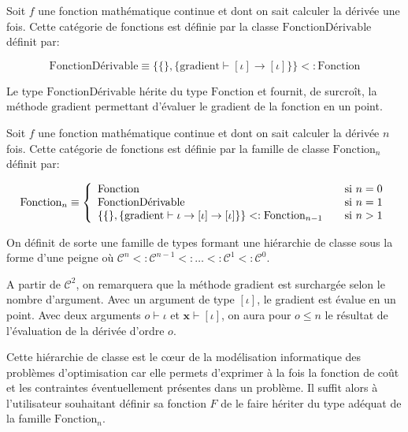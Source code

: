 \begin{mydef}\label{def:chap1_derivfcn}
  Soit $f$ une fonction mathématique continue et dont on sait calculer
  la dérivée une fois. Cette catégorie de fonctions est définie par la
  classe $\text{FonctionDérivable}$ définit par:

  \begin{equation}
    \text{FonctionDérivable} \equiv \{ \{ \}, \{ \text{gradient}
    \vdash [\iota] \rightarrow [\iota] \} \} <: \text{Fonction}
  \end{equation}

  Le type $\text{FonctionDérivable}$ hérite du type $\text{Fonction}$
  et fournit, de surcroît, la méthode $\text{gradient}$ permettant
  d'évaluer le gradient de la fonction en un point.
\end{mydef}

\begin{mydef}\label{def:chap1_nderivfcn}
  Soit $f$ une fonction mathématique continue et dont on sait calculer
  la dérivée $n$ fois. Cette catégorie de fonctions est définie par la
  famille de classe $\text{Fonction}_n$ définit par:

  \begin{equation}
    \text{Fonction}_n \equiv
    \left\{
    \begin{array}{l l}
      \text{Fonction} & \quad \text{si $n = 0$}\\
      \text{FonctionDérivable} & \quad \text{si $n = 1$}\\
      \{ \{ \}, \{ \text{gradient} \vdash \iota \rightarrow [\iota] \rightarrow [\iota] \} \} <: \text{Fonction}_{n-1} & \quad \text{si $n > 1$}\\
    \end{array} \right.
  \end{equation}

  On définit de sorte une famille de types formant une hiérarchie de
  classe sous la forme d'une peigne où $\mathcal{C}^n <:
  \mathcal{C}^{n-1} <: \dotsc <: \mathcal{C}^1 <: \mathcal{C}^0$.

  A partir de $\mathcal{C}^2$, on remarquera que la méthode
  $\text{gradient}$ est surchargée selon le nombre d'argument. Avec un
  argument de type $[\iota]$, le gradient est évalue en un point. Avec
  deux arguments $o \vdash \iota$ et $\mathbf{x} \vdash [\iota]$, on
  aura pour $o \leq n$ le résultat de l'évaluation de la dérivée d'ordre
  $o$.
\end{mydef}


Cette hiérarchie de classe est le c\oe ur de la modélisation
informatique des problèmes d'optimisation car elle permets d'exprimer
à la fois la fonction de coût et les contraintes éventuellement
présentes dans un problème. Il suffit alors à l'utilisateur souhaitant
définir sa fonction $F$ de le faire hériter du type adéquat de la
famille $\text{Fonction}_n$.

